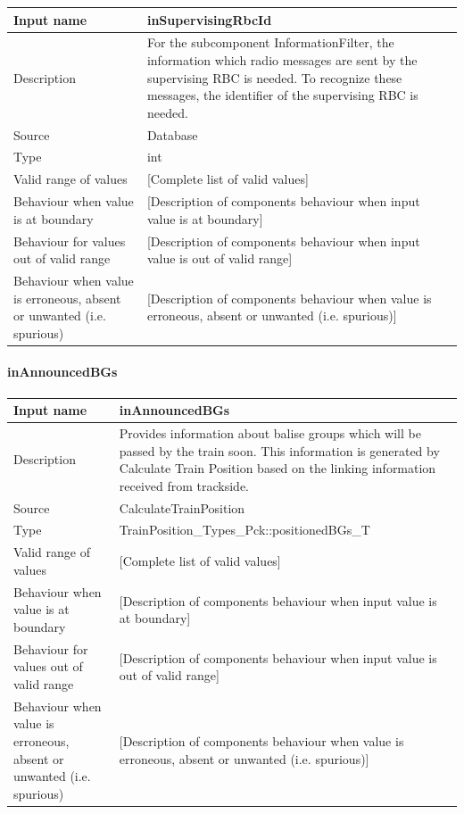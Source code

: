 \begin{longtable}{p{}p{}}
\toprule
Input name				& inSupervisingRbcId \\
\midrule
Description				& For the subcomponent InformationFilter, the information which radio messages are sent by the supervising RBC is needed. To recognize these messages, the identifier of the supervising RBC is needed. \\
\midrule
Source					& Database \\ 
\midrule
Type					& int \\
\midrule
Valid range of values	& [Complete list of valid values] \\
\midrule
Behaviour when value is at boundary	& [Description of components behaviour when input value is at boundary] \\
\midrule
Behaviour for values out of valid range	& [Description of components behaviour when input value is out of valid range] \\
\midrule
Behaviour when value is erroneous, absent or unwanted (i.e. spurious) & [Description of components behaviour when value is erroneous, absent or unwanted (i.e. spurious)] \\
\bottomrule
\end{longtable}


\paragraph{inAnnouncedBGs}

\begin{longtable}{p{}p{}}
\toprule
Input name				& inAnnouncedBGs \\
\midrule
Description				& Provides information about balise groups which will be passed by the train soon. This information is generated by Calculate Train Position based on the linking information received from trackside. \\
\midrule
Source					& CalculateTrainPosition \\ 
\midrule
Type					& TrainPosition\_Types\_Pck::positionedBGs\_T \\
\midrule
Valid range of values	& [Complete list of valid values] \\
\midrule
Behaviour when value is at boundary	& [Description of components behaviour when input value is at boundary] \\
\midrule
Behaviour for values out of valid range	& [Description of components behaviour when input value is out of valid range] \\
\midrule
Behaviour when value is erroneous, absent or unwanted (i.e. spurious) & [Description of components behaviour when value is erroneous, absent or unwanted (i.e. spurious)] \\
\bottomrule
\end{longtable}


